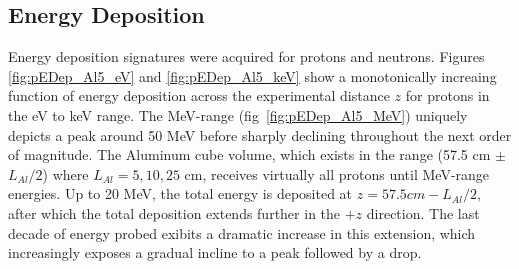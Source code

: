 \documentclass[11pt]{article}
\begin{document}
\begin{multicols}{2}
\subsection{Energy Deposition}

Energy deposition signatures were acquired for protons and neutrons.  Figures \ref{fig:pEDep_Al5_eV} and \ref{fig:pEDep_Al5_keV} show a monotonically increaing function of energy deposition across the experimental distance $z$ for protons in the eV to keV range.  The MeV-range (fig~\ref{fig:pEDep_Al5_MeV}) uniquely depicts a peak around 50 MeV before sharply declining throughout the next order of magnitude.  The Aluminum cube volume, which exists in the range (57.5 cm $\pm$ $L_{Al}/2$) where $L_{Al}=5,10,25$ cm, receives virtually all protons until MeV-range energies.  Up to 20 MeV, the total energy is deposited at $z=57.5 cm - L_{Al}/2$, after which the total deposition extends further in the $+z$ direction.  The last decade of energy probed exibits a dramatic increase in this extension, which increasingly exposes a gradual incline to a peak followed by a drop.


\end{multicols}
\end{document}
